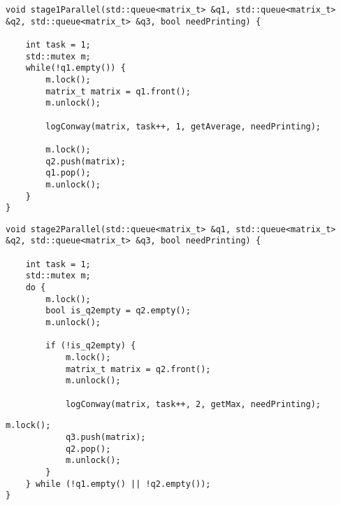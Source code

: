 \begin{center}
\captionsetup{justification=raggedright,singlelinecheck=off}
\begin{lstlisting}[label=lst:stage1,caption=Алгоритм запуска 1 потока для нахождения среднего арифметического элементов матрицы]
void stage1Parallel(std::queue<matrix_t> &q1, std::queue<matrix_t> &q2, std::queue<matrix_t> &q3, bool needPrinting) {
	
	int task = 1;
	std::mutex m;
	while(!q1.empty()) {
		m.lock();
		matrix_t matrix = q1.front();
		m.unlock();
		
		logConway(matrix, task++, 1, getAverage, needPrinting);
		
		m.lock();
		q2.push(matrix);
		q1.pop();
		m.unlock();
	}
}
\end{lstlisting}
\end{center}

\begin{center}
	\captionsetup{justification=raggedright,singlelinecheck=off}
	\begin{lstlisting}[label=lst:stage2,caption=Алгоритм запуска 2 потока для нахождения максимального элемента матрицы, часть 1]
void stage2Parallel(std::queue<matrix_t> &q1, std::queue<matrix_t> &q2, std::queue<matrix_t> &q3, bool needPrinting) {
	
	int task = 1;
	std::mutex m;
	do {
		m.lock();
		bool is_q2empty = q2.empty();
		m.unlock();
		
		if (!is_q2empty) {
			m.lock();
			matrix_t matrix = q2.front();
			m.unlock();
			
			logConway(matrix, task++, 2, getMax, needPrinting);
	\end{lstlisting}
\end{center}

\begin{center}
	\captionsetup{justification=raggedright,singlelinecheck=off}
	\begin{lstlisting}[label=lst:stage2,caption=Алгоритм запуска 2 потока для нахождения максимального элемента матрицы, часть 2]
			m.lock();
			q3.push(matrix);
			q2.pop();
			m.unlock();
		}
	} while (!q1.empty() || !q2.empty());
}
	\end{lstlisting}
\end{center}

